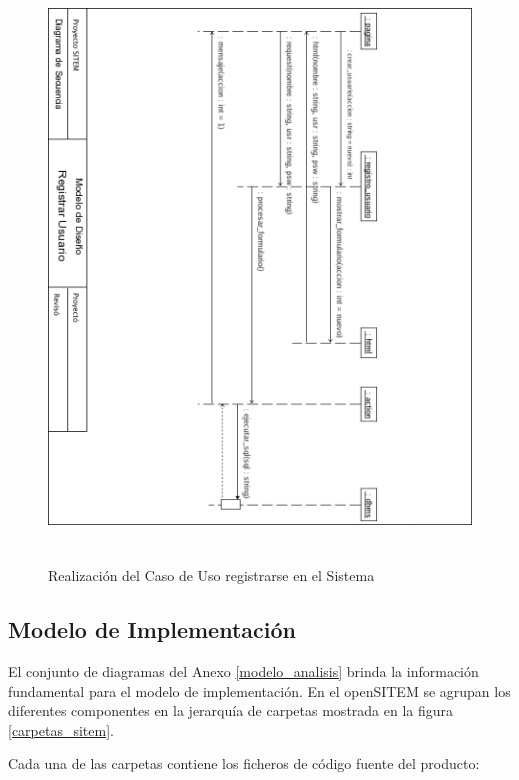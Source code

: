 \begin{figure}
 \centering
 \includegraphics[width=156mm, height=156mm]{secuencia.png}
 \caption{Realización del Caso de Uso registrarse en el Sistema}
 \label{secuencia}
\end{figure}


\subsection{Modelo de Implementación}

El conjunto de diagramas del Anexo \ref{modelo_analisis} brinda la información fundamental para el modelo de implementación. En el openSITEM se agrupan los diferentes componentes en la jerarquía de carpetas mostrada en la figura \ref{carpetas_sitem}.

Cada una de las carpetas contiene los ficheros de código fuente del producto:

